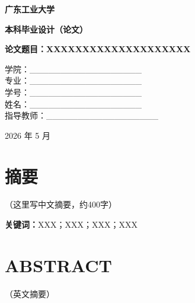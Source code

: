 


\thispagestyle{empty}
\begin{center}
\vspace*{3cm}

\heiti\fontsize{22pt}{24pt}\bfseries 广东工业大学

\vspace{2.5cm}

\heiti\fontsize{16pt}{18pt}\bfseries 本科毕业设计（论文）

\vspace{2cm}

\heiti\fontsize{15pt}{17pt}\bfseries
论文题目：XXXXXXXXXXXXXXXXXXXX

\vspace{2cm}

\fontsize{14pt}{16pt}\selectfont
学院：\_\_\_\_\_\_\_\_\_\_\_\_\_\_\_\_\_\_ \\
专业：\_\_\_\_\_\_\_\_\_\_\_\_\_\_\_\_\_\_ \\
学号：\_\_\_\_\_\_\_\_\_\_\_\_\_\_\_\_\_\_ \\
姓名：\_\_\_\_\_\_\_\_\_\_\_\_\_\_\_\_\_\_ \\
指导教师：\_\_\_\_\_\_\_\_\_\_\_\_\_\_\_\_\_\_

\vspace{3cm}

2026 年 5 月
\end{center}
\clearpage

\setcounter{page}{1}

\chapter*{\heiti 摘\quad 要}

（这里写中文摘要，约400字）

\vspace{1em}
\noindent\textbf{关键词：}XXX；XXX；XXX；XXX

\clearpage

\chapter*{\bfseries ABSTRACT}

（英文摘要）

